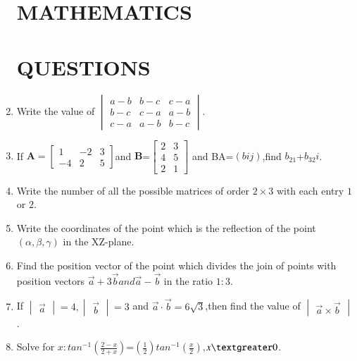 \documentclass[12pt,-letter paper]{article}
\let\vec\mathbf{}
\let\vec\mathbf{}
\let\vec\mathbf{}
\providecommand{\mydet}[1]{\ensuremath{\begin{vmatrix}#1\end{vmatrix}}}
\providecommand{\myvec}[1]{\ensuremath{\begin{bmatrix}#1\end{bmatrix}}}
\providecommand{\brak}[1]{\ensuremath{\left(#1\right)}}
\begin{document}
\begin{enumerate}
\section*{\centering MATHEMATICS}
		\section*{\centering QUESTIONS}
	\item Write the value of $\mydet{a-b&b-c&c-a\\b-c&c-a&a-b\\c-a&a-b&b-c}$.

	\item If $\vec{A}=\myvec{1&-2&3\\-4&2&5}$and $\vec{B}$=$\myvec{2&3\\4&5\\2&1}$ and BA=\brak{bij},find $b_{21}$+$b_{32}i$.

\item Write the number of all the possible matrices of order $2\times3$ with each entry $1$ or $2$.

\item Write the coordinates of the point which is the reflection of the point $(\alpha,\beta,\gamma)$ in the XZ-plane.

\item Find the position vector of the point which divides the join of points with position vectors $\overset{\rightarrow}{a}+3\overset{\rightarrow}{b} and \overset{\rightarrow}{a}-\overset{\rightarrow}{b}$ in the ratio $1:3$.
\item If $\mydet{\overset{\rightarrow}{a}}=4,\mydet{\overset{\rightarrow}{b}}=3$ and $\overset{\rightarrow}{a}\cdot\overset{\rightarrow}{b}=6\sqrt{3}$,then find the value of $\mydet{\overset{\rightarrow}{a}\times\overset{\rightarrow}{b}}$.

\item Solve for $x:tan^{-1}\brak{\frac{2-x}{2+x}}$=$\brak{\frac{1}{2}}tan^{-1}\brak{\frac{x}{2}}$,$x \textgreater 0$.
	

\end{enumerate}
\end{document}
